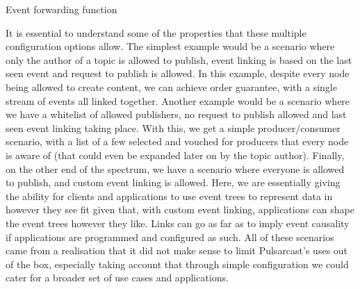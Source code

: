 \vspace{8pt}
\begin{algorithm}
  \SetAlgoLined
  \caption{Event forwarding function}
    \label{alg:send-event}
\end{algorithm}
\vspace{8pt}

It is essential to understand some of the properties that these multiple
configuration options allow. The simplest example would be a scenario where
only the author of a topic is allowed to publish, event linking is based on the
last seen event and request to publish is allowed. In this example, despite
every node being allowed to create content, we can achieve order guarantee,
with a single stream of events all linked together. Another example would be a
scenario where we have a whitelist of allowed publishers, no request to publish
allowed and last seen event linking taking place. With this, we get a simple
producer/consumer scenario, with a list of a few selected and vouched for
producers that every node is aware of (that could even be expanded later on by
the topic author). Finally, on the other end of the spectrum, we have a
scenario where everyone is allowed to publish, and custom event linking is
allowed. Here, we are essentially giving the ability for clients and
applications to use event trees to represent data in however they see fit given
that, with custom event linking, applications can shape the event trees however
they like. Links can go as far as to imply event causality if applications are
programmed and configured as such. All of these scenarios came from a
realisation that it did not make sense to limit Pulsarcast's uses out of the
box, especially taking account that through simple configuration we could cater
for a broader set of use cases and applications.
